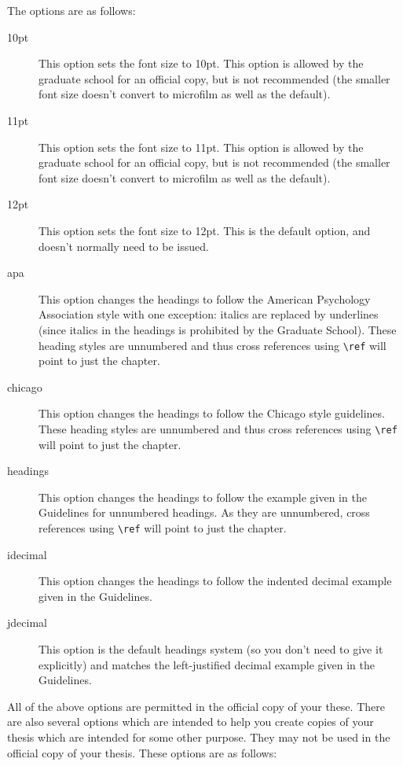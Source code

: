\pagebreak[3]The options are as follows:
\begin{description}
\item[10pt]{This option sets the font size to 10pt.  This option is allowed by the graduate school for an official copy, but is not recommended (the smaller font size doesn't convert to microfilm as well as the default).}
\item[11pt]{This option sets the font size to 11pt.  This option is allowed by the graduate school for an official copy, but is not recommended (the smaller font size doesn't convert to microfilm as well as the default).}
\item[12pt]{This option sets the font size to 12pt.  This is the default option, and doesn't normally need to be issued.}
\item[apa]{This option changes the headings to follow the American Psychology Association style with one exception: italics are replaced by underlines (since italics in the headings is prohibited by the Graduate School).  These heading styles are unnumbered and thus cross references using \verb=\ref= will point to just the chapter.}
\item[chicago]{This option changes the headings to follow the Chicago style guidelines.  These heading styles are unnumbered and thus cross references using \verb=\ref= will point to just the chapter.}
\item[headings]{This option changes the headings to follow the example given in the Guidelines for unnumbered headings.  As they are unnumbered, cross references using \verb=\ref= will point to just the chapter.}
\item[idecimal]{This option changes the headings to follow the indented decimal example given in the Guidelines.}
\item[jdecimal]{This option is the default headings system (so you don't need to give it explicitly) and matches the left-justified decimal example given in the Guidelines.}
\end{description}

All of the above options are permitted in the official copy of your these.  There are also several options which are intended to help you create copies of your thesis which are intended for some other purpose.  They may not be used in the official copy of your thesis.  These options are as follows:

